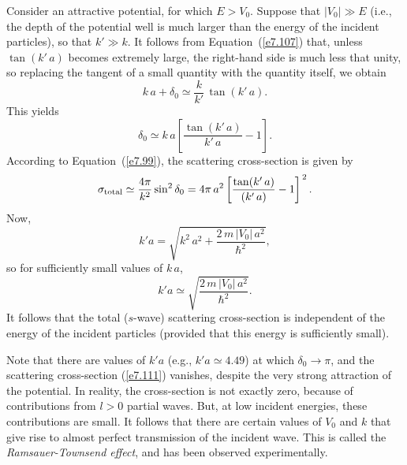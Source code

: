 Consider an attractive potential, for which $E>V_0$. Suppose that 
$|V_0|\gg E$ ({\rm i.e.}, the depth of the potential well is much larger than
the energy of the incident particles), so that $k' \gg k$. It follows
from Equation~(\ref{e7.107}) that, unless $\tan (k'\,a)$ becomes extremely large, the right-hand side is much less that unity, so replacing the tangent of a
small quantity with the quantity itself, we obtain
\begin{equation}
k\,a + \delta_0 \simeq \frac{k}{k'}\,\tan (k'\,a).
\end{equation}
This yields
\begin{equation}
\delta_0 \simeq k\,a \left[ \frac{\tan( k'\,a)}{k'\,a} -1\right].
\end{equation}
According to Equation~(\ref{e7.99}), the scattering cross-section is given by
\begin{equation}\label{e7.111}
\sigma_{\rm total} \simeq \frac{4\pi}{k^2} \sin^2\delta_0
=4\pi \,a^2\left[\frac{\tan (k'\,a)}{(k'\,a)} -1\right]^{\,2}.
\end{equation}
Now, 
\begin{equation}\label{e7.112}
k'a = \sqrt{ k^2 \,a^2 + \frac{2 \,m \,|V_0|\, a^2}{\hbar^2}},
\end{equation}
so for sufficiently small values of $k\,a$,
\begin{equation}
k' a \simeq \sqrt{\frac{2\, m \,|V_0|\, a^2}{\hbar^2}}.
\end{equation}
It follows that the total ($s$-wave) scattering cross-section is independent
of the energy of the incident particles (provided that this energy is
sufficiently small). 

Note that there are values of $k'a$ ({\rm e.g.}, $k'a\simeq 4.49$) at which
$\delta_0\rightarrow \pi$, and 
the scattering cross-section (\ref{e7.111}) vanishes, despite the very strong
attraction of the potential. In reality, the cross-section is not
exactly zero, because of contributions from $l>0$ partial waves. But,
at low incident energies, these contributions are small. It follows that
there are certain values of $V_0$ and $k$ that  give rise to almost perfect 
transmission of the incident wave. This is called the {\em Ramsauer-Townsend
effect}, and has been observed experimentally. 

